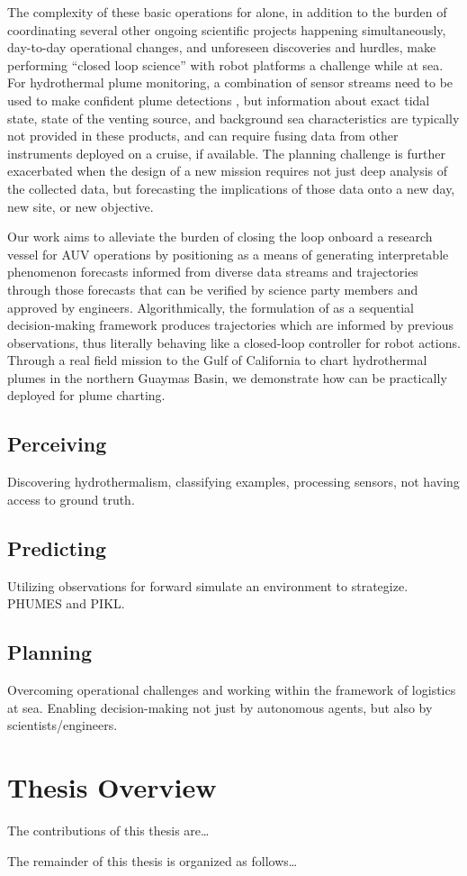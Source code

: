 The complexity of these basic operations for \Sentry alone, in addition to the burden of coordinating several other ongoing scientific projects happening simultaneously, day-to-day operational changes, and unforeseen discoveries and hurdles, make performing ``closed loop science'' with robot platforms a challenge while at sea. For hydrothermal plume monitoring, a combination of sensor streams need to be used to make confident plume detections \autocite{jakuba2007stochastic}, but information about exact tidal state, state of the venting source, and background sea characteristics are typically not provided in these products, and can require fusing data from other instruments deployed on a cruise, if available. The planning challenge is further exacerbated when the design of a new mission requires not just deep analysis of the collected data, but forecasting the implications of those data onto a new day, new site, or new objective. 

Our work aims to alleviate the burden of closing the loop onboard a research vessel for AUV operations by positioning \PHORTEX as a means of generating interpretable phenomenon forecasts informed from diverse data streams and trajectories through those forecasts that can be verified by science party members and approved by \Sentry engineers. Algorithmically, the formulation of \PHORTEX as a sequential decision-making framework produces trajectories which are informed by previous observations, thus literally behaving like a closed-loop controller for robot actions. Through a real field mission to the Gulf of California to chart hydrothermal plumes in the northern Guaymas Basin, we demonstrate how \PHORTEX can be practically deployed for plume charting.


\subsection{Perceiving}
Discovering hydrothermalism, classifying examples, processing sensors, not having access to ground truth.

\subsection{Predicting}
Utilizing observations for forward simulate an environment to strategize. PHUMES and PIKL.

\subsection{Planning}
Overcoming operational challenges and working within the framework of logistics at sea. Enabling decision-making not just by autonomous agents, but also by scientists/engineers.

\section{Thesis Overview}
The contributions of this thesis are\dots

The remainder of this thesis is organized as follows\dots